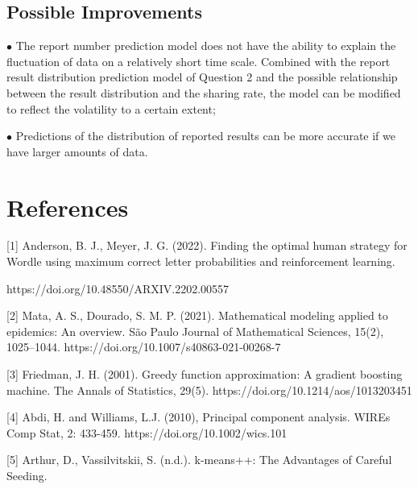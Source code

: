 \documentclass[
  journal=medium,
  manuscript=Report,
  year=2023,
  volume=37,
]{cup-journal}
\begin{document}
\subsection{Possible Improvements}

$\bullet$ The report number prediction model does not have the ability to explain the fluctuation of data on a relatively short time scale. Combined with the report result distribution prediction model of Question 2 and the possible relationship between the result distribution and the sharing rate, the model can be modified to reflect the volatility to a certain extent;

$\bullet$ Predictions of the distribution of reported results can be more accurate if we have larger amounts of data.

\section{References}

[1] Anderson, B. J., Meyer, J. G. (2022). Finding the optimal human strategy for Wordle using maximum correct letter probabilities and reinforcement learning. 

https://doi.org/10.48550/ARXIV.2202.00557 

[2] Mata, A. S., Dourado, S. M. P. (2021). Mathematical modeling applied to epidemics: An overview. São Paulo Journal of Mathematical Sciences, 15(2), 1025–1044. https://doi.org/10.1007/s40863-021-00268-7 

[3] Friedman, J. H. (2001). Greedy function approximation: A gradient boosting machine. The Annals of Statistics, 29(5). https://doi.org/10.1214/aos/1013203451 

[4] Abdi, H. and Williams, L.J. (2010), Principal component analysis. WIREs Comp Stat, 2: 433-459. https://doi.org/10.1002/wics.101 

[5] Arthur, D., Vassilvitskii, S. (n.d.). k-means++: The Advantages of Careful Seeding.
\end{document}

